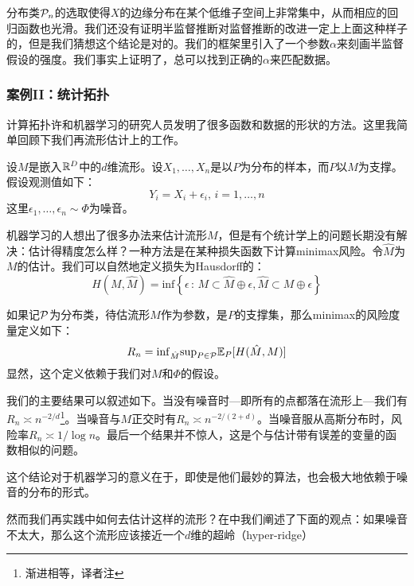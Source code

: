 \documentclass[]{article}
\begin{document}
分布类${\mathcal{P}}_n$的选取使得$X$的边缘分布在某个低维子空间上非常集中，从而相应的回归函数也光滑。我们还没有证明半监督推断对监督推断的改进一定上上面这种样子的，但是我们猜想这个结论是对的。我们的框架里引入了一个参数$\alpha$来刻画半监督假设的强度。我们事实上证明了，总可以找到正确的$\alpha$来匹配数据。

\subsubsection{案例II：统计拓扑}
计算拓扑许和机器学习的研究人员发明了很多函数和数据的形状的方法。这里我简单回顾下我们再流形估计上的工作\cite{wass2012a,wass2012b,wass2012c}。

设$M$是嵌入${\mathbb{R}}^D$中的$d$维流形。设$X_1,\ldots,X_n$是以$P$为分布的样本，而$P$以$M$为支撑。假设观测值如下：
$$  Y_i = X_i + \epsilon_i, \, i=1,\ldots,n $$
这里$\epsilon_1,\ldots,\epsilon_n \sim \Phi$为噪音。

机器学习的人想出了很多办法来估计流形$M$，但是有个统计学上的问题长期没有解决：估计得精度怎么样？一种方法是在某种损失函数下计算minimax风险。令$\hat{M}$为$M$的估计。我们可以自然地定义损失为Hausdorff的：
$$ H(M,\hat{M}) = \mathrm{inf} \left\{ \epsilon \, : \, M \subset \hat{M} \oplus \epsilon , \hat{M} \subset M \oplus \epsilon \right\} $$

如果记${\mathcal{P}}$为分布类，待估流形$M$作为参数，是$P$的支撑集，那么minimax的风险度量定义如下：
$$ R_n = \mathrm{inf}_{\hat{M}} \mathrm{sup}_{P \in {\mathcal{P}}} {\mathbb{E}}_P [ H(\hat{M}, M) ] $$
显然，这个定义依赖于我们对$M$和$\Phi$的假设。

我们的主要结果可以叙述如下。当没有噪音时---即所有的点都落在流形上---我们有$R_n \asymp n^{-2/d} $\footnote{渐进相等，译者注}。当噪音与$M$正交时有$R_n \asymp n^{-2/(2+d)} $。当噪音服从高斯分布时，风险率$R_n \asymp 1/\log n$。最后一个结果并不惊人，这是个与估计带有误差的变量的函数相似的问题。

这个结论对于机器学习的意义在于，即使是他们最妙的算法，也会极大地依赖于噪音的分布的形式。

然而我们再实践中如何去估计这样的流形？在\cite{wass2012c}中我们阐述了下面的观点：如果噪音不太大，那么这个流形应该接近一个$d$维的超岭（hyper-ridge）






\end{document}
